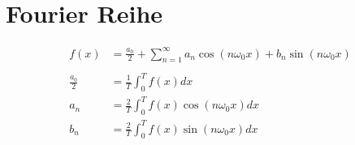 \section{Fourier Reihe}

\begin{align*}
f(x) &=\frac{a_{0}}{2} + \sum_{n=1}^{\infty}{a_{n}\cos{(n\omega_{0}x)}+b_{n}\sin{(n\omega_{0}x)}}\\ \\
\frac{a_{0}}{2} &= \frac{1}{T}\int_{0}^{T}{f(x)dx}\\
a_{n} &= \frac{2}{T}\int_{0}^{T}{f(x)\cos{(n\omega_{0}x)}dx}\\
b_{n} &= \frac{2}{T}\int_{0}^{T}{f(x)\sin{(n\omega_{0}x)}dx}\\
\end{align*}

